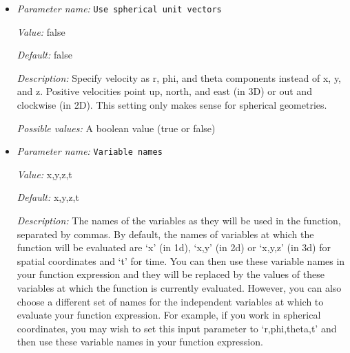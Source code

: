 \begin{itemize}
{\it Value:} 0; 0; 0


{\it Default:} 0; 0; 0


{\it Description:} The formula that denotes the function you want to evaluate for particular values of the independent variables. This expression may contain any of the usual operations such as addition or multiplication, as well as all of the common functions such as `sin' or `cos'. In addition, it may contain expressions like `if(x>0, 1, -1)' where the expression evaluates to the second argument if the first argument is true, and to the third argument otherwise. For a full overview of possible expressions accepted see the documentation of the muparser library at http://muparser.beltoforion.de/.

If the function you are describing represents a vector-valued function with multiple components, then separate the expressions for individual components by a semicolon.


{\it Possible values:} Any string
\item {\it Parameter name:} {\tt Use spherical unit vectors}
\label{parameters:Boundary velocity model/Function/Use spherical unit vectors}
\label{parameters:Boundary_20velocity_20model/Function/Use_20spherical_20unit_20vectors}


{\it Value:} false


{\it Default:} false


{\it Description:} Specify velocity as r, phi, and theta components instead of x, y, and z. Positive velocities point up, north, and east (in 3D) or out and clockwise (in 2D). This setting only makes sense for spherical geometries.


{\it Possible values:} A boolean value (true or false)
\item {\it Parameter name:} {\tt Variable names}
\label{parameters:Boundary velocity model/Function/Variable names}
\label{parameters:Boundary_20velocity_20model/Function/Variable_20names}


{\it Value:} x,y,z,t


{\it Default:} x,y,z,t


{\it Description:} The names of the variables as they will be used in the function, separated by commas. By default, the names of variables at which the function will be evaluated are `x' (in 1d), `x,y' (in 2d) or `x,y,z' (in 3d) for spatial coordinates and `t' for time. You can then use these variable names in your function expression and they will be replaced by the values of these variables at which the function is currently evaluated. However, you can also choose a different set of names for the independent variables at which to evaluate your function expression. For example, if you work in spherical coordinates, you may wish to set this input parameter to `r,phi,theta,t' and then use these variable names in your function expression.



\end{itemize}
